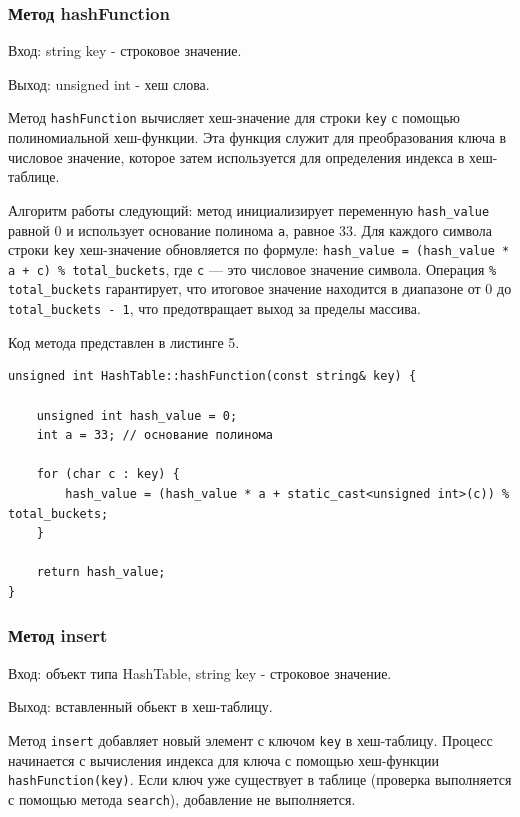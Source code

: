 \documentclass[11pt,a4paper,final]{article} %
\begin{document}
\subsubsection{Метод hashFunction}
Вход: string key - строковое значение. \par
Выход: unsigned int - хеш слова. \par
\par Метод \texttt{hashFunction} вычисляет хеш-значение для строки \texttt{key} с помощью полиномиальной хеш-функции. Эта функция служит для преобразования ключа в числовое значение, которое затем используется для определения индекса в хеш-таблице.

\par Алгоритм работы следующий: метод инициализирует переменную \texttt{hash\_value} равной 0 и использует основание полинома \texttt{a}, равное 33. Для каждого символа строки \texttt{key} хеш-значение обновляется по формуле: \texttt{hash\_value = (hash\_value * a + c) \% total\_buckets}, где \texttt{c} — это числовое значение символа. Операция \texttt{\% total\_buckets} гарантирует, что итоговое значение находится в диапазоне от 0 до \texttt{total\_buckets - 1}, что предотвращает выход за пределы массива.

Код метода представлен в листинге 5.
\begin{lstlisting}[label=hashCode, caption = Метод hashFunction]
unsigned int HashTable::hashFunction(const string& key) {
	
	unsigned int hash_value = 0;
	int a = 33; // основание полинома
	
	for (char c : key) {
		hash_value = (hash_value * a + static_cast<unsigned int>(c)) % total_buckets;
	}
	
	return hash_value;
}
\end{lstlisting}

\subsubsection{Метод insert}
Вход: объект типа HashTable, string key - строковое значение. \par
Выход: вставленный обьект в хеш-таблицу. 

\par Метод \texttt{insert} добавляет новый элемент с ключом \texttt{key} в хеш-таблицу. Процесс начинается с вычисления индекса для ключа с помощью хеш-функции \texttt{hashFunction(key)}. Если ключ уже существует в таблице (проверка выполняется с помощью метода \texttt{search}), добавление не выполняется. 
\end{document}
